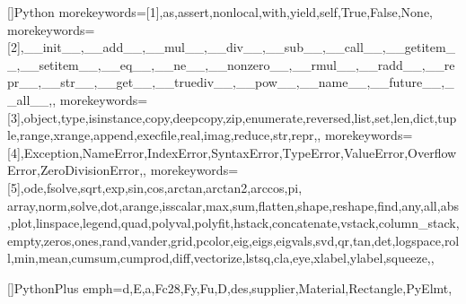 


\pagestyle{fancy}

\fancyhead[L]{\small{\leftmark}}
\fancyhead[C]{}

\fancyfoot[C]{}

\setlength{\headsep}{1cm}

\renewcommand{\headrulewidth}{1pt}
\renewcommand{\footrulewidth}{0.4pt}

\renewcommand{\baselinestretch}{1.5}


\usepackage{color}


[]{Python}{
  morekeywords=[1]{,as,assert,nonlocal,with,yield,self,True,False,None,} %
  morekeywords=[2]{,__init__,__add__,__mul__,__div__,__sub__,__call__,__getitem__,__setitem__,__eq__,__ne__,__nonzero__,__rmul__,__radd__,__repr__,__str__,__get__,__truediv__,__pow__,__name__,__future__,__all__,}, %
  morekeywords=[3]{,object,type,isinstance,copy,deepcopy,zip,enumerate,reversed,list,set,len,dict,tuple,range,xrange,append,execfile,real,imag,reduce,str,repr,}, %
  morekeywords=[4]{,Exception,NameError,IndexError,SyntaxError,TypeError,ValueError,OverflowError,ZeroDivisionError,}, %
  morekeywords=[5]{,ode,fsolve,sqrt,exp,sin,cos,arctan,arctan2,arccos,pi, array,norm,solve,dot,arange,isscalar,max,sum,flatten,shape,reshape,find,any,all,abs,plot,linspace,legend,quad,polyval,polyfit,hstack,concatenate,vstack,column_stack,empty,zeros,ones,rand,vander,grid,pcolor,eig,eigs,eigvals,svd,qr,tan,det,logspace,roll,min,mean,cumsum,cumprod,diff,vectorize,lstsq,cla,eye,xlabel,ylabel,squeeze,}, %
}

[]{PythonPlus}{
  emph={d,E,a,Fc28,Fy,Fu,D,des,supplier,Material,Rectangle,PyElmt},
}

